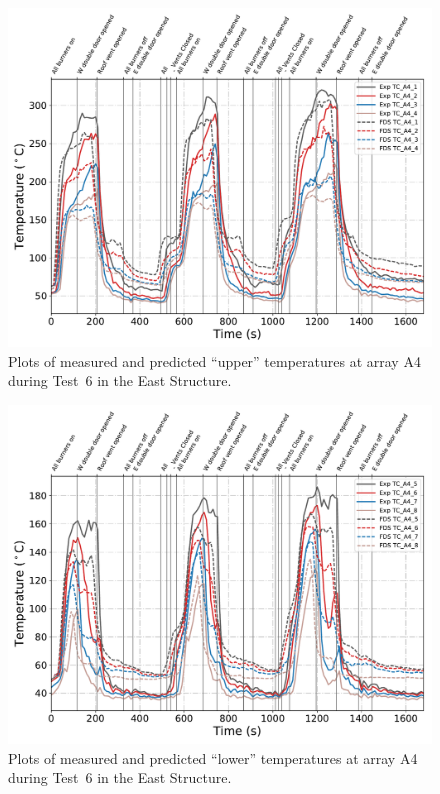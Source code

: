 \clearpage
\begin{figure}[p]
	\centering
	\includegraphics[width=\columnwidth]{Figures/Plots/Validation/Temperature/Test_6_TC_A4_upper}
	\caption{Plots of measured and predicted ``upper'' temperatures at array A4 during Test~6 in the East Structure.}
	\label{fig:TCA4_upper_data_Test6}
\end{figure}
\begin{figure}[p]
	\centering
	\includegraphics[width=\columnwidth]{Figures/Plots/Validation/Temperature/Test_6_TC_A4_lower}
	\caption{Plots of measured and predicted ``lower'' temperatures at array A4 during Test~6 in the East Structure.}
	\label{fig:TCA4_lower_data_Test6}
\end{figure}

